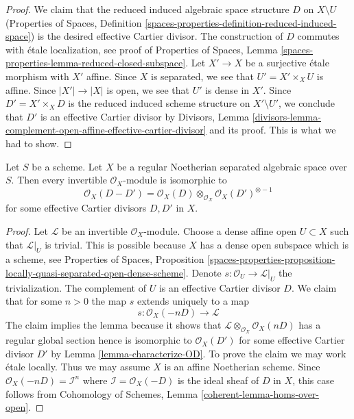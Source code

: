 \begin{proof}
We claim that the reduced induced algebraic space structure $D$
on $X \setminus U$ (Properties of Spaces, Definition
\ref{spaces-properties-definition-reduced-induced-space})
is the desired effective Cartier divisor. The construction
of $D$ commutes with \'etale localization, see proof of
Properties of Spaces, Lemma
\ref{spaces-properties-lemma-reduced-closed-subspace}.
Let $X' \to X$ be a surjective \'etale morphism with $X'$ affine.
Since $X$ is separated, we see that $U' = X' \times_X U$ is
affine. Since $|X'| \to |X|$ is open, we see that $U'$
is dense in $X'$. Since $D' = X' \times_X D$ is the reduced induced
scheme structure on $X' \setminus U'$, we conclude that
$D'$ is an effective Cartier divisor by
Divisors, Lemma
\ref{divisors-lemma-complement-open-affine-effective-cartier-divisor}
and its proof. This is what we had to show.
\end{proof}

\begin{lemma}
\label{lemma-Noetherian-regular-separated-pic-effective-Cartier}
Let $S$ be a scheme. Let $X$ be a regular Noetherian separated algebraic space
over $S$. Then every invertible $\mathcal{O}_X$-module is isomorphic to
$$
\mathcal{O}_X(D - D') =
\mathcal{O}_X(D) \otimes_{\mathcal{O}_X} \mathcal{O}_X(D')^{\otimes -1}
$$
for some effective Cartier divisors $D, D'$ in $X$.
\end{lemma}

\begin{proof}
Let $\mathcal{L}$ be an invertible $\mathcal{O}_X$-module.
Choose a dense affine open $U \subset X$ such that
$\mathcal{L}|_U$ is trivial. This is possible because
$X$ has a dense open subspace which is a scheme, see
Properties of Spaces, Proposition
\ref{spaces-properties-proposition-locally-quasi-separated-open-dense-scheme}.
Denote $s : \mathcal{O}_U \to \mathcal{L}|_U$ the trivialization.
The complement of $U$ is an effective Cartier divisor
$D$. We claim that for some $n > 0$ the map $s$ extends uniquely to a map
$$
s : \mathcal{O}_X(-nD) \longrightarrow \mathcal{L}
$$
The claim implies the lemma because it shows that
$\mathcal{L} \otimes_{\mathcal{O}_X} \mathcal{O}_X(nD)$
has a regular global section hence is isomorphic to
$\mathcal{O}_X(D')$ for some effective Cartier divisor $D'$
by Lemma \ref{lemma-characterize-OD}.
To prove the claim we may work \'etale locally. Thus we may assume
$X$ is an affine Noetherian scheme. Since
$\mathcal{O}_X(-nD) = \mathcal{I}^n$ where $\mathcal{I} = \mathcal{O}_X(-D)$
is the ideal sheaf of $D$ in $X$, this case follows from
Cohomology of Schemes, Lemma \ref{coherent-lemma-homs-over-open}.
\end{proof}

